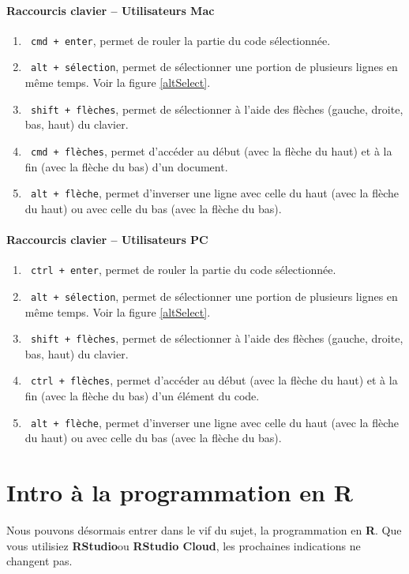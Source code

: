 \documentclass[10.5pt,a4paper]{article}
\newcommand{\rcode}[1]{\texttt{\color{rstudio} #1}}
\begin{document}
      \paragraph{Raccourcis clavier -- Utilisateurs Mac}
      \begin{enumerate}
        \item \rcode{cmd + enter}, permet de rouler la partie du code sélectionnée.
        \item \rcode{alt + sélection}, permet de sélectionner une portion de plusieurs lignes en même temps. Voir la figure \ref{altSelect}.
        \item \rcode{shift + flèches}, permet de sélectionner à l'aide des flèches (gauche, droite, bas, haut) du clavier.
        \item \rcode{cmd + flèches}, permet d'accéder au début (avec la flèche du haut) et à la fin (avec la flèche du bas) d'un document.
        \item \rcode{alt + flèche}, permet d'inverser une ligne avec celle du haut (avec la flèche du haut) ou avec celle du bas (avec la flèche du bas).
      \end{enumerate}
      
      \paragraph{Raccourcis clavier -- Utilisateurs PC}
      \begin{enumerate}
        \item \rcode{ctrl + enter}, permet de rouler la partie du code sélectionnée.
        \item \rcode{alt + sélection}, permet de sélectionner une portion de plusieurs lignes en même temps. Voir la figure \ref{altSelect}.
        \item \rcode{shift + flèches}, permet de sélectionner à l'aide des flèches (gauche, droite, bas, haut) du clavier.
        \item \rcode{ctrl + flèches}, permet d'accéder au début (avec la flèche du haut) et à la fin (avec la flèche du bas) d'un élément du code.
        \item \rcode{alt + flèche}, permet d'inverser une ligne avec celle du haut (avec la flèche du haut) ou avec celle du bas (avec la flèche du bas).
      \end{enumerate}
      
\section{Intro à la programmation en R}
Nous pouvons désormais entrer dans le vif du sujet, la programmation en \textbf{R}. Que vous utilisiez \textbf{RStudio}ou \textbf{RStudio Cloud}, les prochaines indications ne changent pas. 
      
\end{document}
